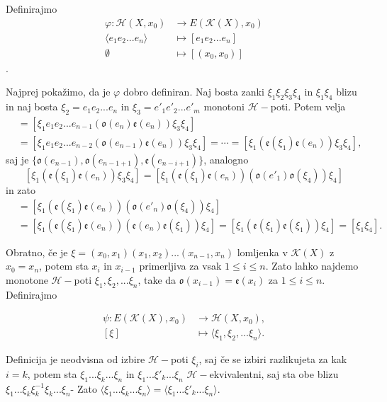 \documentclass[mat1]{fmfdelo}
\DeclareRobustCommand{\h}{
    \mathcal{H}}
\begin{document}
\begin{dokaz}
    Definirajmo 
    \begin{align*}
\varphi:\mathscr{H}(X,x_0)&\rightarrow E(\mathcal{K}(X),x_0)\\
\langle e_1e_2...e_n\rangle&\mapsto [e_1e_2...e_n]\\
\emptyset &\mapsto [(x_0,x_0)]
    \end{align*}.

    Najprej pokažimo, da je $\varphi$ dobro definiran.
    Naj bosta zanki $\xi_1 \xi_2 \xi_3 \xi_4$ in $\xi_1 \xi_4 $ blizu in naj bosta $\xi_2 = e_1e_2...e_n$ in $\xi_3 = e'_1e'_2...e'_m$ monotoni $\h-$poti. Potem velja 
\begin{align*}
    [\xi_1 \xi_2 \xi_3 \xi_4]&=[\xi_1 e_1e_2...e_{n-1}(\mathfrak{o}(e_n)\mathfrak{e}(e_n)) \xi_3 \xi_4]\\
    &=[\xi_1 e_1e_2...e_{n-2}(\mathfrak{o}(e_{n-1})\mathfrak{e}(e_n)) \xi_3 \xi_4]=\cdots=[\xi_1(\mathfrak{e}(\xi_1)\mathfrak{e}(e_n)) \xi_3 \xi_4],
\end{align*}
saj je $\{\mathfrak{o}(e_{n-1}),\mathfrak{o}(e_{n-1+1}),\mathfrak{e}(e_{n-i+1})\}$, analogno 
$$
[\xi_1(\mathfrak{e}(\xi_1)\mathfrak{e}(e_n)) \xi_3 \xi_4]=[\xi_1(\mathfrak{e}(\xi_1)\mathfrak{e}(e_n))( \mathfrak{o}(e'_1)\mathfrak{o}(\xi_4)) \xi_4]
$$
in zato 
\begin{align*}
    [\xi_1 \xi_2 \xi_3 \xi_4]&=[\xi_1(\mathfrak{e}(\xi_1)\mathfrak{e}(e_n)) (\mathfrak{o}(e'_n)\mathfrak{o}(\xi_4)) \xi_4]\\
    &=[\xi_1(\mathfrak{e}(\xi_1)\mathfrak{e}(e_n)) (\mathfrak{e}(e_n)\mathfrak{e}(\xi_1)) \xi_4]=[\xi_1(\mathfrak{e}(\xi_1) \mathfrak{e}(\xi_1)) \xi_4]=[\xi_1 \xi_4].
\end{align*}


Obratno, če je $\xi =(x_0,x_1)(x_1,x_2)...(x_{n-1},x_n)$ lomljenka v $\mathcal{K}(X)$ z $x_0=x_n$, potem sta $x_i$ in $x_{i-1}$ primerljiva za vsak $1\leq i \leq n$. Zato lahko najdemo monotone $\h-$poti $\xi_1, \xi_2,... \xi_n$, take da $\mathfrak{o}(x_{i-1})=\mathfrak{e}(x_i)$ za $1\leq i \leq n$. Definirajmo

\begin{align*}
    \psi: E(\mathcal{K}(X),x_0)&\rightarrow \mathscr{H}(X,x_0),\\
    [\xi]&\mapsto \langle\xi_1, \xi_2,... \xi_n\rangle.
\end{align*}

Definicija je neodvisna od izbire $\h-$poti $\xi_i$, saj če se izbiri razlikujeta za kak $i=k$, potem sta $\xi_1...\xi_k...\xi_n$ in $\xi_1...\xi'_k...\xi_n$ $\h-$ekvivalentni, saj sta obe blizu $\xi_1...\xi_k\xi_k^{-1}\xi_k...\xi_n$- Zato $\langle \xi_1...\xi_k...\xi_n \rangle = \langle \xi_1...\xi'_k...\xi_n \rangle$.


\end{dokaz}
\end{document}
